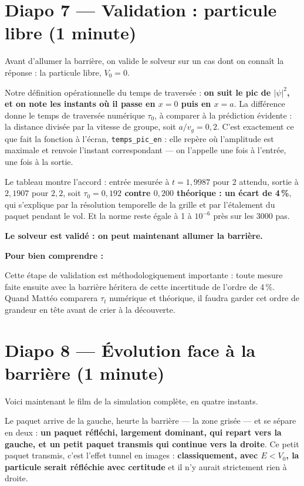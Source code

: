 \documentclass[11pt,a4paper]{article}
\newcommand{\diapo}[2]{\section*{Diapo #1 --- #2}}
\newenvironment{comprendre}%
{\par\medskip\noindent\hrulefill\par\nopagebreak\textbf{Pour bien comprendre :}\itshape\par}%
{\par\nopagebreak\noindent\hrulefill\par\medskip}
\begin{document}
	\diapo{7}{Validation : particule libre (1 minute)}
	
	Avant d'allumer la barrière, on valide le solveur sur un cas dont on connaît la
	réponse : la particule libre, $V_0 = 0$.
	
	Notre définition opérationnelle du temps de traversée : \textbf{on suit le pic de
		$|\psi|^2$, et on note les instants où il passe en $x = 0$ puis en $x = a$}. La
	différence donne le temps de traversée numérique $\tau_0$, à comparer à la
	prédiction évidente : la distance divisée par la vitesse de groupe, soit
	$a / v_g = 0{,}2$. C'est exactement ce que fait la fonction à l'écran,
	\texttt{temps\_pic\_en} : elle repère où l'amplitude est maximale et renvoie
	l'instant correspondant --- on l'appelle une fois à l'entrée, une fois à la
	sortie.
	
	Le tableau montre l'accord : entrée mesurée à $t = 1{,}9987$ pour $2$ attendu,
	sortie à $2{,}1907$ pour $2{,}2$, soit \textbf{$\tau_0 = 0{,}192$ contre
		$0{,}200$ théorique : un écart de 4\,\%}, qui s'explique par la résolution
	temporelle de la grille et par l'étalement du paquet pendant le vol. Et la norme
	reste égale à 1 à $10^{-6}$ près sur les 3000 pas.
	
	\textbf{Le solveur est validé : on peut maintenant allumer la barrière.}
	
	\begin{comprendre}
		Cette étape de validation est méthodologiquement importante : toute mesure faite
		ensuite avec la barrière héritera de cette incertitude de l'ordre de 4\,\%. Quand
		Mattéo comparera $\tau_t$ numérique et théorique, il faudra garder cet ordre de
		grandeur en tête avant de crier à la découverte.
	\end{comprendre}
	
	\diapo{8}{Évolution face à la barrière (1 minute)}
	
	Voici maintenant le film de la simulation complète, en quatre instants.
	
	Le paquet arrive de la gauche, heurte la barrière --- la zone grisée --- et se
	sépare en deux : \textbf{un paquet réfléchi, largement dominant, qui repart vers
		la gauche, et un petit paquet transmis qui continue vers la droite}. Ce petit
	paquet transmis, c'est l'effet tunnel en images : \textbf{classiquement, avec
		$E < V_0$, la particule serait réfléchie avec certitude} et il n'y aurait
	strictement rien à droite.
	
\end{document}
